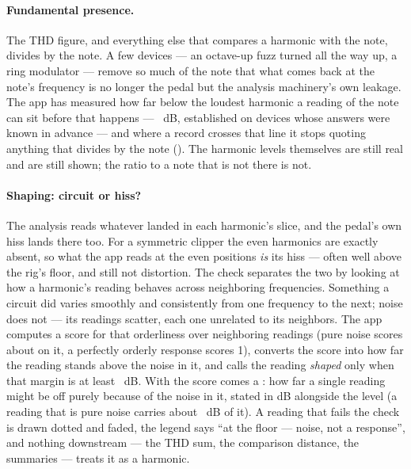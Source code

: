 \documentclass[11pt,a4paper]{article}
\begin{document}
\paragraph{Fundamental presence.} The THD figure, and everything else
that compares a harmonic with the note, divides by the note. A few
devices --- an octave-up fuzz turned all the way up, a ring modulator ---
remove so much of the note that what comes back at the note's frequency
is no longer the pedal but the analysis machinery's own leakage. The app
has measured how far below the loudest harmonic a reading of the note can
sit before that happens --- \hdSeparationDB{}~dB, established on devices
whose answers were known in advance --- and where a record crosses that
line it stops quoting anything that divides by the note
(). The harmonic levels themselves are still
real and are still shown; the ratio to a note that is not there is not.

\paragraph{Shaping: circuit or hiss?} The analysis reads whatever landed
in each harmonic's slice, and the pedal's own hiss lands there too. For a
symmetric clipper the even harmonics are exactly absent, so what the app
reads at the even positions \emph{is} its hiss --- often well above the
rig's floor, and still not distortion. The  check separates
the two by looking at how a harmonic's reading behaves across
neighboring frequencies. Something a circuit did varies smoothly and
consistently from one frequency to the next; noise does not --- its
readings scatter, each one unrelated to its neighbors. The app computes
a  score for that orderliness over \hdShapingWindowSamples{}
neighboring readings (pure noise scores about \hdUnshapedCoherence{}
on it, a perfectly orderly response scores 1), converts the score into
how far the reading stands above the noise in it, and calls the reading
\emph{shaped} only when that margin is at least \hdShapedSNRDB{}~dB. With
the score comes a : how far a single reading might be off
purely because of the noise in it, stated in dB alongside the level (a
reading that is pure noise carries about \hdUnshapedScatterDB{}~dB of
it). A reading that fails the check is drawn dotted and faded, the legend
says ``at the floor --- noise, not a response'', and nothing downstream
--- the THD sum, the comparison distance, the summaries --- treats it as
a harmonic.
\end{document}
